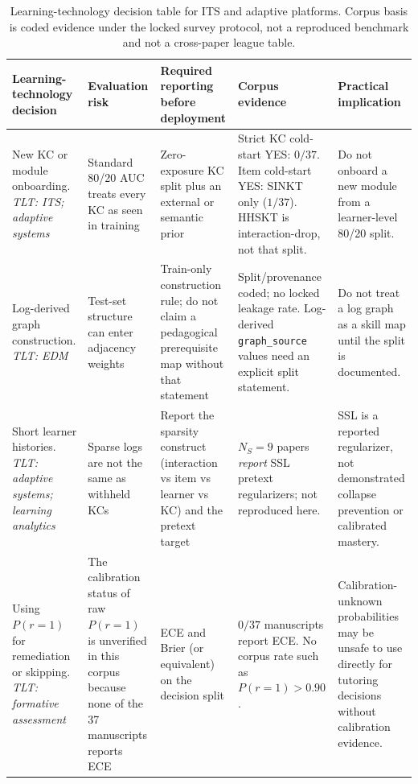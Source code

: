 \documentclass[lettersize,journal]{IEEEtran}
\begin{document}
\begin{table}[t]
\caption{Learning-technology decision table for ITS and adaptive platforms. Corpus basis is coded evidence under the locked survey protocol, not a reproduced benchmark and not a cross-paper league table.}
\label{tab:its_implications}
\centering
\footnotesize
\setlength{\tabcolsep}{2.8pt}
\begin{tabular}{@{}>{\raggedright\arraybackslash}p{}
>{\raggedright\arraybackslash}p{}
>{\raggedright\arraybackslash}p{}
>{\raggedright\arraybackslash}p{}
>{\raggedright\arraybackslash}p{}@{}}
\toprule
\textbf{Learning-technology decision} & \textbf{Evaluation risk} & \textbf{Required reporting before deployment} & \textbf{Corpus evidence} & \textbf{Practical implication} \\
\midrule
New KC or module onboarding.
\textit{TLT: ITS; adaptive systems} & Standard 80/20 AUC treats every KC as seen in training & Zero-exposure KC split plus an external or semantic prior & Strict KC cold-start YES: $0/37$. Item cold-start YES: SINKT only ($1/37$). HHSKT is interaction-drop, not that split. & Do not onboard a new module from a learner-level 80/20 split. \\
Log-derived graph construction.
\textit{TLT: EDM} & Test-set structure can enter adjacency weights & Train-only construction rule; do not claim a pedagogical prerequisite map without that statement & Split/provenance coded; no locked leakage rate. Log-derived \texttt{graph\_source} values need an explicit split statement. & Do not treat a log graph as a skill map until the split is documented. \\
Short learner histories.
\textit{TLT: adaptive systems; learning analytics} & Sparse logs are not the same as withheld KCs & Report the sparsity construct (interaction vs item vs learner vs KC) and the pretext target & $N_S=9$ papers \emph{report} SSL pretext regularizers; not reproduced here. & SSL is a reported regularizer, not demonstrated collapse prevention or calibrated mastery. \\
Using $P(r=1)$ for remediation or skipping.
\textit{TLT: formative assessment} & The calibration status of raw $P(r=1)$ is unverified in this corpus because none of the 37 manuscripts reports ECE & ECE and Brier (or equivalent) on the decision split & $0/37$ manuscripts report ECE. No corpus rate such as $P(r=1)>0.90$. & Calibration-unknown probabilities may be unsafe to use directly for tutoring decisions without calibration evidence. \\

\end{tabular}
\end{table}
\end{document}
